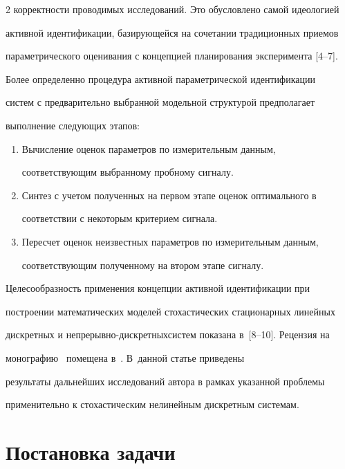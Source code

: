 \begin{multicols}{2}
корректности проводимых исследований. Это обусловлено самой идеологией


активной идентификации, базирующейся на сочетании традиционных приемов


параметрического оценивания с концепцией планирования эксперимента [4--7].





  Более определенно процедура активной параметрической идентификации


систем с предварительно выбранной модельной структурой предполагает


выполнение следующих этапов:


  \begin{enumerate}[1.]


\item Вычисление оценок параметров по измерительным данным,


соответствующим выбранному пробному сигналу.


\item Синтез с учетом полученных на первом этапе оценок оптимального в


соответствии с некоторым критерием сигнала.


\item Пересчет оценок неизвестных параметров по измерительным данным,


соответствующим полученному на втором этапе сигналу.


\end{enumerate}





  Целесообразность применения концепции активной идентификации при


построении ма\-те\-ма\-тических моделей стохастических стационарных линейных


дискретных и непрерывно-дискретных\linebreak сис\-тем показана в~[8--10]. Рецензия на


монографию~\cite{10-c} помещена в~\cite{11-c}. В~данной статье приведены


результаты дальнейших исследований автора в рамках указанной проблемы


применительно к стохастическим нелинейным дискретным системам.





\section{Постановка задачи}






\end{multicols}
